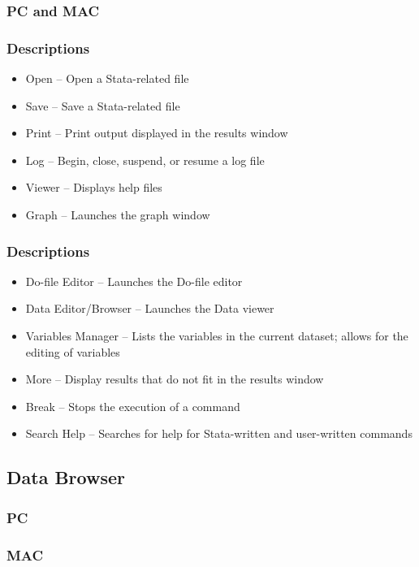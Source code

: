 \documentclass{beamer}
\begin{document}
\begin{frame}
	\frametitle{PC and MAC}
\end{frame}

\begin{frame}
	\frametitle{Descriptions}
		\begin{itemize}
			\item Open -- Open a Stata-related file
			\item Save -- Save a Stata-related file
			\item Print -- Print output displayed in the results window
			\item Log -- Begin, close, suspend, or resume a log file
			\item Viewer -- Displays help files
			\item Graph -- Launches the graph window
		\end{itemize}
\end{frame}

\begin{frame}
	\frametitle{Descriptions}
		\begin{itemize}
			\item Do-file Editor -- Launches the Do-file editor
			\item Data Editor/Browser -- Launches the Data viewer
			\item Variables Manager -- Lists the variables in the current dataset; allows for the editing of variables
			\item More -- Display results that do not fit in the results window
			\item Break -- Stops the execution of a command
			\item Search Help -- Searches for help for Stata-written and user-written commands
		\end{itemize}
\end{frame}

\subsection{Data Browser}

\begin{frame}
	\frametitle{PC}
\end{frame}

\begin{frame}
	\frametitle{MAC}
\end{frame}
\end{document}
